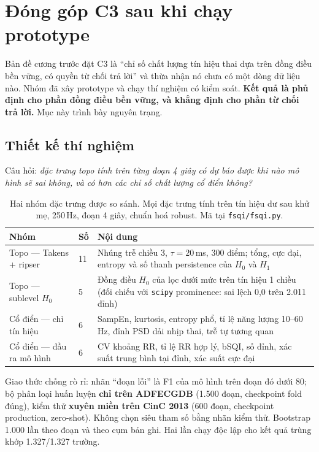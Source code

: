\section{Đóng góp C3 sau khi chạy prototype}
\label{sec:fsqi}

Bản đề cương trước đặt C3 là ``chỉ số chất lượng tín hiệu thai dựa trên đồng điều bền vững, có quyền
từ chối trả lời'' và thừa nhận nó chưa có một dòng dữ liệu nào. Nhóm đã xây prototype và chạy thí nghiệm
có kiểm soát. \textbf{Kết quả là phủ định cho phần đồng điều bền vững, và khẳng định cho phần từ chối
trả lời.} Mục này trình bày nguyên trạng.

\subsection{Thiết kế thí nghiệm}

Câu hỏi: \textit{đặc trưng topo tính trên từng đoạn 4 giây có dự báo được khi nào mô hình sẽ sai không,
và có hơn các chỉ số chất lượng cổ điển không?}

\begin{table}[H]\centering\small
\caption{Hai nhóm đặc trưng được so sánh. Mọi đặc trưng tính trên tín hiệu dư sau khử mẹ, 250\,Hz, đoạn
4 giây, chuẩn hoá robust. Mã tại \texttt{fsqi/fsqi.py}.}
\label{tab:fsqi_dactrung}
\begin{tabular}{@{}L{3.4cm} C{1.0cm} L{9.8cm}@{}}
\toprule
\textbf{Nhóm} & \textbf{Số} & \textbf{Nội dung} \\
\midrule
Topo --- Takens + ripser & 11 & Nhúng trễ chiều 3, $\tau = 20$\,ms, 300 điểm; tổng, cực đại, entropy và
số thanh persistence của $H_0$ và $H_1$ \\
Topo --- sublevel $H_0$ & 5 & Đồng điều $H_0$ của lọc dưới mức trên tín hiệu 1 chiều (đối chiếu với
\texttt{scipy} prominence: sai lệch 0,0 trên 2.011 đỉnh) \\
Cổ điển --- chỉ tín hiệu & 6 & SampEn, kurtosis, entropy phổ, tỉ lệ năng lượng 10--60\,Hz, đỉnh PSD dải
nhịp thai, trễ tự tương quan \\
Cổ điển --- đầu ra mô hình & 6 & CV khoảng RR, tỉ lệ RR hợp lý, bSQI, số đỉnh, xác suất trung bình tại
đỉnh, xác suất cực đại \\
\bottomrule
\end{tabular}
\end{table}

Giao thức chống rò rỉ: nhãn ``đoạn lỗi'' là F1 của mô hình trên đoạn đó dưới 80; bộ phân loại huấn luyện
\textbf{chỉ trên ADFECGDB} (1.500 đoạn, checkpoint fold đúng), kiểm thử \textbf{xuyên miền trên CinC 2013}
(600 đoạn, checkpoint production, zero-shot). Không chọn siêu tham số bằng nhãn kiểm thử. Bootstrap 1.000
lần theo đoạn và theo cụm bản ghi. Hai lần chạy độc lập cho kết quả trùng khớp 1.327/1.327 trường.

